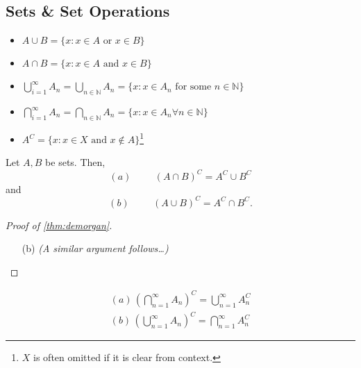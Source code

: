 \documentclass[12pt]{article}
\begin{document}

\subsection{Sets \& Set Operations}
\begin{itemize}
  \item $A \cup B = \{x : x \in A \text{ or } x \in B\}$
  \item $A \cap B = \{x : x \in A \text{ and } x \in B\}$
  \item $\bigcup_{i=1}^{\infty} A_n = \bigcup_{n \in \mathbb{N}} A_n = \{x : x \in A_n \text{ for some } n \in \mathbb{N}\}$
  \item $\bigcap_{i=1}^{\infty} A_n = \bigcap_{n \in \mathbb{N}} A_n = \{x : x \in A_n \forall n \in \mathbb{N}\}$
  \item $A^C = \{x : x\in X \text{ and } x \notin A\}$\footnote{$X$ is often omitted if it is clear from context.}
\end{itemize}

\begin{theorem}\label{thm:demorgan}
  Let $A, B$ be sets. Then,
  \[(a)\hspace{1cm}(A \cap B)^C = A^C \cup B^C\]and
  \[(b)\hspace{1cm}(A \cup B)^C = A^C \cap B^C.\]
\end{theorem}
\begin{proof}[Proof of \cref{thm:demorgan}]

\begin{itemize}
  \item[(b)] \emph{(A similar argument follows\dots)}
\end{itemize}
\end{proof}
\begin{proposition}\label{prop:demorgangen}
  \begin{align*}
    (a)\, \left(\bigcap_{n=1}^\infty A_n\right)^C = \bigcup_{n=1}^\infty A_n^C \\
    (b)\, \left(\bigcup_{n=1}^\infty A_n\right)^C = \bigcap_{n=1}^\infty A_n^C 
  \end{align*}
\end{proposition}
\end{document}
